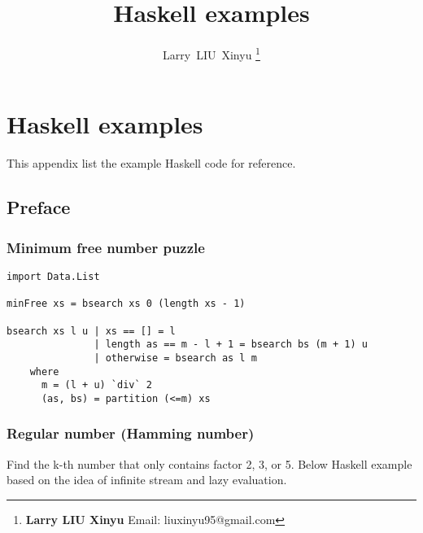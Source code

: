 \documentclass{article}
\begin{document}


\title{Haskell examples}

\author{Larry~LIU~Xinyu
\thanks{{\bfseries Larry LIU Xinyu } \newline
  Email: liuxinyu95@gmail.com \newline}
  }

\maketitle
\fi


\ifx\wholebook\relax
\chapter{Haskell examples}
\fi

This appendix list the example Haskell code for reference.

\section{Preface}

\subsection{Minimum free number puzzle}

\lstset{language=Haskell, frame=single}
\begin{lstlisting}[caption=The divide and conquer solution to the mininum free number puzzle.]
import Data.List

minFree xs = bsearch xs 0 (length xs - 1)

bsearch xs l u | xs == [] = l
               | length as == m - l + 1 = bsearch bs (m + 1) u
               | otherwise = bsearch as l m
    where
      m = (l + u) `div` 2
      (as, bs) = partition (<=m) xs
\end{lstlisting}

\subsection{Regular number (Hamming number)}
Find the k-th number that only contains factor 2, 3, or 5. Below Haskell
example based on the idea of infinite stream and lazy evaluation.
\end{document}
